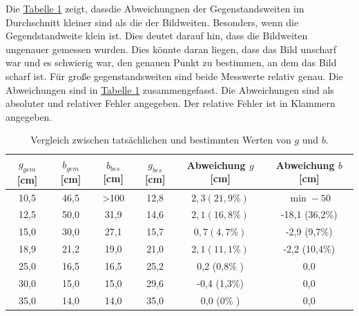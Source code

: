 Die \hyperref[tab:vergleich_g_b]{Tabelle \ref*{tab:vergleich_g_b}} zeigt, dassdie Abweichungnen der Gegenstandsweiten im Durchschnitt kleiner sind als die der Bildweiten. Besonders, wenn die Gegendstandweite klein ist. Dies deutet darauf hin, dass die Bildweiten ungenauer gemessen wurden. Dies könnte daran liegen, dass das Bild unscharf war und es schwierig war, den genauen Punkt zu bestimmen, an dem das Bild scharf ist. Für große gegenstandsweiten sind beide Messwerte relativ genau. Die Abweichungen sind in \hyperref[tab:vergleich_g_b]{Tabelle \ref*{tab:vergleich_g_b}} zusammengefasst. Die Abweichungen sind als absoluter und relativer Fehler angegeben. Der relative Fehler ist in Klammern angegeben.


\begin{table}[h!]
    \centering
    \caption{Vergleich zwischen tatsächlichen und bestimmten Werten von $g$ und $b$.}
    \begin{tabular}{c c c c c c}
        \hline
        $g_{gem}$ [cm] &  $b_{gem}$ [cm] & $b_{bes}$ [cm] & $g_{bes}$ [cm] & \cellcolor{red!10}Abweichung $g$ [cm] & \cellcolor{red!10}Abweichung $b$ [cm] \\
        \hline
        10,5 & 46,5 & >100 & 12,8 & \cellcolor{red!10}$2,3 (21,9\%) $& \cellcolor{red!10} $\min -50$ \\
        12,5 & 50,0 & 31,9 & 14,6 & \cellcolor{red!10}$2,1 (16,8\%)$ & \cellcolor{red!10}-18,1 (36,2\%) \\
        15,0 & 30,0 & 27,1 & 15,7 & \cellcolor{red!10}$0,7 (4,7 \%)$ & \cellcolor{red!10}-2,9 (9,7\%)\\
        18,9 & 21,2 & 19,0 & 21,0 & \cellcolor{red!10}$2,1 (11,1\%)$ & \cellcolor{red!10}-2,2 (10,4\%)\\
        25,0 & 16,5 & 16,5 & 25,2 & \cellcolor{red!10}0,2 (0,8\% ) & \cellcolor{red!10}0,0 \\
        30,0 & 15,0 & 15,0 & 29,6 & \cellcolor{red!10}-0,4 (1,3\%) & \cellcolor{red!10}0,0 \\
        35,0 & 14,0 & 14,0 & 35,0 & \cellcolor{red!10}0,0  (0\%  ) & \cellcolor{red!10}0,0 \\
        \hline
    \end{tabular}
    \label{tab:vergleich_g_b}
\end{table}

